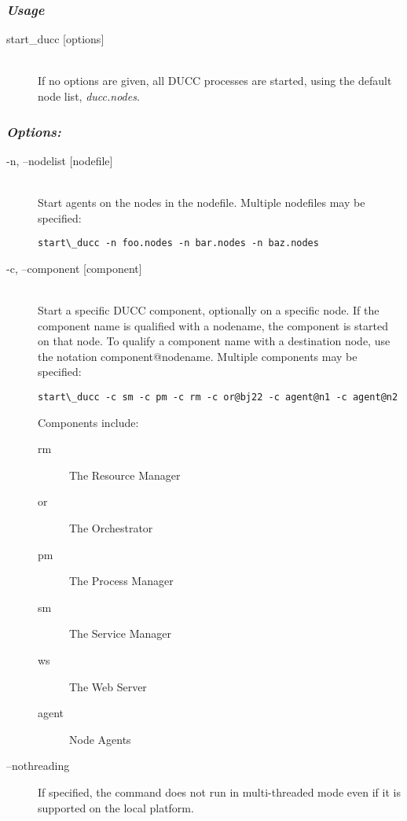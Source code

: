     \subsubsection{{\em Usage}}

    \begin{description}
      \item[start\_ducc {[options]}] \hfill \\ 
        If no options are given, all DUCC processes are started, using the default node list, 
        {\em ducc.nodes}. 
      
      \end{description}
      
      \subsubsection{{\em Options: }}
      \begin{description}

        \item[-n, --nodelist {[nodefile] }] \hfill \\
          Start agents on the nodes in the nodefile. Multiple nodefiles may be specified: 
\begin{verbatim}
start\_ducc -n foo.nodes -n bar.nodes -n baz.nodes 
\end{verbatim}
          

        \item[-c, --component {[component] }] \hfill \\
          Start a specific DUCC component, optionally on a specific node. If the component 
          name is qualified with a nodename, the component is started on that node. To qualify 
          a component name with a destination node, use the notation component@nodename. 
          Multiple components may be specified: 
\begin{verbatim}
start\_ducc -c sm -c pm -c rm -c or@bj22 -c agent@n1 -c agent@n2 
\end{verbatim}
          
          Components include: 
          \begin{description}
            \item[rm] The Resource Manager
            \item[or]The Orchestrator
            \item[pm]The Process Manager
            \item[sm]The Service Manager
            \item[ws]The Web Server
            \item[agent]Node Agents
          \end{description}

          \item[--nothreading] If specified, the command does not run in multi-threaded mode
            even if it is supported on the local platform.

      \end{description}

